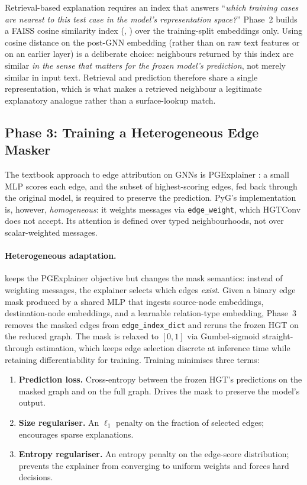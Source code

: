Retrieval-based explanation requires an index that answers
``\emph{which training cases are nearest to this test case in the
model's representation space?}''  Phase~2 builds a FAISS cosine
similarity index (, )
over the training-split embeddings only.  Using cosine distance on
the post-GNN embedding (rather than on raw text features or on an
earlier layer) is a deliberate choice: neighbours returned by this
index are similar \emph{in the sense that matters for the frozen
model's prediction}, not merely similar in input text.  Retrieval and
prediction therefore share a single representation, which is what
makes a retrieved neighbour a legitimate explanatory analogue rather
than a surface-lookup match.

\subsection{Phase 3: Training a Heterogeneous Edge Masker}

The textbook approach to edge attribution on GNNs is PGExplainer
\cite{luo2020parameterized}: a small MLP scores each edge, and the
subset of highest-scoring edges, fed back through the original model,
is required to preserve the prediction.  PyG's implementation is,
however, \emph{homogeneous}: it weights messages via
\texttt{edge\_weight}, which HGTConv does not accept.  Its attention
is defined over typed neighbourhoods, not over scalar-weighted
messages.

\paragraph{Heterogeneous adaptation.}
 keeps the PGExplainer objective but
changes the mask semantics: instead of weighting messages, the
explainer selects which edges \emph{exist}.  Given a binary edge mask
produced by a shared MLP that ingests source-node embeddings,
destination-node embeddings, and a learnable relation-type embedding,
Phase~3 removes the masked edges from \texttt{edge\_index\_dict} and
reruns the frozen HGT on the reduced graph.  The mask is relaxed to
$[0,1]$ via Gumbel-sigmoid straight-through estimation, which keeps
edge selection discrete at inference time while retaining
differentiability for training.  Training minimises three terms:

\begin{enumerate}
  \item \textbf{Prediction loss.}  Cross-entropy between the frozen
    HGT's predictions on the masked graph and on the full graph.
    Drives the mask to preserve the model's output.
  \item \textbf{Size regulariser.}  An $\ell_1$ penalty on the
    fraction of selected edges; encourages sparse explanations.
  \item \textbf{Entropy regulariser.}  An entropy penalty on the
    edge-score distribution; prevents the explainer from converging
    to uniform weights and forces hard decisions.
\end{enumerate}


